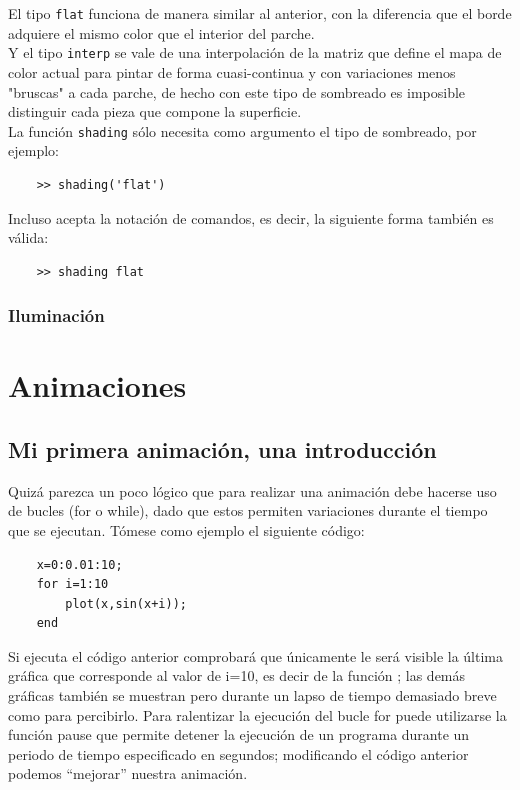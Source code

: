 El tipo \texttt{flat} funciona de manera similar al anterior, con la diferencia que el borde 
adquiere el mismo color que el interior del parche.\\

Y el tipo \texttt{interp} se vale de una interpolación de la matriz que define el mapa de 
color actual para pintar de forma cuasi-continua y con variaciones menos "bruscas" a 
cada parche, de hecho con este tipo de sombreado es imposible distinguir cada pieza 
que compone la superficie.\\

La función \texttt{shading} sólo necesita como argumento el tipo de sombreado, por ejemplo:

\begin{verbatim}
	>> shading('flat')
\end{verbatim}

Incluso acepta la notación de comandos, es decir, la siguiente forma también es válida:

\begin{verbatim}
	>> shading flat
\end{verbatim}

\subsubsection{Iluminación}

\section{Animaciones}

\subsection{Mi primera animación, una introducción}

Quizá parezca un poco lógico que para realizar una animación debe hacerse uso de bucles 
(for o while), dado que estos permiten variaciones durante el tiempo que se ejecutan. 
Tómese como ejemplo el siguiente código:

\begin{verbatim}
	x=0:0.01:10;
	for i=1:10
	    plot(x,sin(x+i));
	end
\end{verbatim}

Si ejecuta el código anterior comprobará que únicamente le será visible la última 
gráfica que corresponde al valor de i=10, es decir de la función   ; las demás gráficas 
también se muestran pero durante un lapso de tiempo demasiado breve como para percibirlo. 
Para ralentizar la ejecución del bucle for puede utilizarse la función pause que permite 
detener la ejecución de un programa durante un periodo de tiempo especificado en segundos; 
modificando el código anterior podemos “mejorar” nuestra animación.

